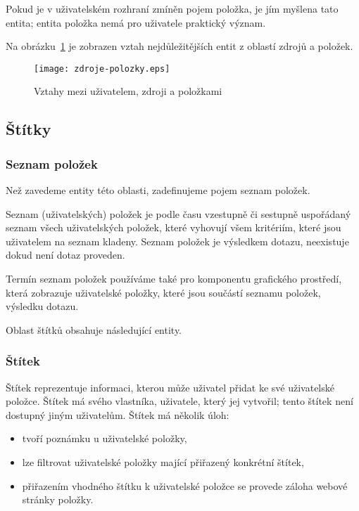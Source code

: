 Pokud je v uživatelském rozhraní zmíněn pojem položka, je jím myšlena tato entita; entita položka nemá pro uživatele praktický význam.

\bigskip

Na obrázku~\ref{fig:source-item} je zobrazen vztah nejdůležitějších entit z oblastí zdrojů a položek.

\begin{figure}
    \centering
    \texttt{[image: zdroje-polozky.eps]}
    \caption{Vztahy mezi uživatelem, zdroji a položkami}
    \label{fig:source-item}
\end{figure}

\subsection{Štítky}

\subsubsection{Seznam položek}
Než zavedeme entity této oblasti, zadefinujeme pojem seznam položek.

Seznam (uživatelských) položek je podle času vzestupně či sestupně uspořádaný seznam všech uživatelských položek, které vyhovují všem kritériím, které jsou uživatelem na seznam kladeny.
Seznam položek je výsledkem dotazu, neexistuje dokud není dotaz proveden.

Termín seznam položek používáme také pro komponentu grafického prostředí, která zobrazuje uživatelské položky, které jsou součástí seznamu položek, výsledku dotazu.

Oblast štítků obsahuje následující entity.

\subsubsection{Štítek}
\label{sss:stitek}

Štítek reprezentuje informaci, kterou může uživatel přidat ke své uživatelské položce.
Štítek má svého vlastníka, uživatele, který jej vytvořil; tento štítek není dostupný jiným uživatelům.
Štítek má několik úloh:
\begin{itemize}
	\item tvoří poznámku u uživatelské položky,
	\item lze filtrovat uživatelské položky mající přiřazený konkrétní štítek,
	\item přiřazením vhodného štítku k uživatelské položce se provede záloha webové stránky položky.
\end{itemize}

